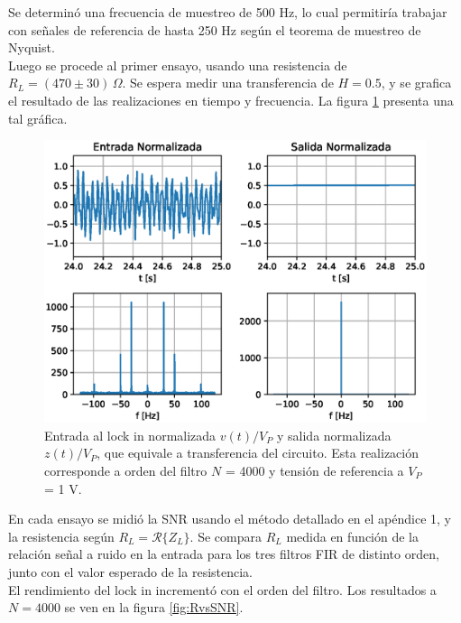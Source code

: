 \documentclass[11pt,a4paper]{extarticle}
\begin{document}
\begin{multicols}{2}
Se determinó una frecuencia de muestreo de 500 Hz, lo cual permitiría trabajar con señales de referencia de hasta 250 Hz 
según el teorema de muestreo de Nyquist.\\

Luego se procede al primer ensayo, usando una resistencia de $R_L = (470 \pm 30)\,\Omega$.
Se espera medir una transferencia de $H = 0.5$, y se grafica el resultado de las realizaciones en tiempo y frecuencia. La figura \ref{fig:in_out} presenta una tal gráfica.\\

\begin{figure}[H]
	\centering
	\includegraphics[width=\linewidth]{Images/in_out.eps}
	\caption{Entrada al lock in normalizada $v(t)/V_P$ y salida normalizada $z(t)/V_P$, 
	que equivale a transferencia del circuito. Esta realización corresponde a orden del filtro $N$ = 4000 y tensión de referencia a $V_P$ = 1 V.}
	\label{fig:in_out}
\end{figure}

En cada ensayo se midió la SNR usando el método detallado en el apéndice 1, y la resistencia según $R_L = \mathcal{R}\{Z_L\}$.
Se compara $R_L$ medida en función de la relación señal a ruido en la entrada para los tres 
filtros FIR de distinto orden, junto con el valor esperado de la resistencia.\\

El rendimiento del lock in incrementó con el orden del filtro. Los resultados a $N = 4000$ se ven en la figura \ref{fig:RvsSNR}.


\end{multicols}
\end{document}
